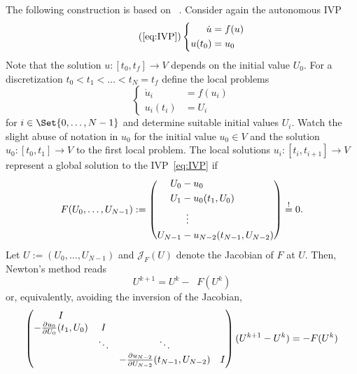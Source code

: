 The following construction is based on \citeauthor{Gander2007}~\cite{Gander2007}.
Consider again the autonomous \ac{IVP}
\begin{equation}
  \tag{\ref*{eq:IVP}}
  \left\{
  \begin{aligned}
    \dot u &= f(u) \\
    u(t_0) &= u_0
  \end{aligned}
  \right.
\end{equation}
Note that the solution $u : [t_0,t_f] \to V $ depends on the initial value $U_0$.
For a discretization $t_0 < t_1 < \ldots < t_N = t_f$
define the local problems
\begin{equation}
  \left\{
  \begin{aligned}
    \dot u_i &= f(u_i) \\
    u_i(t_i) &= U_i
  \end{aligned}
  \right.
\end{equation}
for $i \in \Set{0,\ldots,N-1}$
and determine suitable initial values $U_i$.
Watch the slight abuse of notation in $u_0$
for the initial value $u_0 \in V$
and the solution $u_0 : [t_0,t_1] \to V$ to the first local problem.
The local solutions $u_i : [t_i,t_{i+1}] \to V$ represent a global solution to the \ac{IVP}~\eqref{eq:IVP} if
\begin{equation}
  F(U_0, \ldots, U_{N-1}) :=
  \left(
  \begin{aligned}
    U_0 &- u_0 \\
    U_1 &- u_0(t_1, U_0) \\
    &\vdotswithin{-} \\
    U_{N-1} &- u_{N-2}(t_{N-1}, U_{N-2})
  \end{aligned}
  \right)
  \overset{!}{=} 0.
\end{equation}
Let $U := (U_0, \ldots, U_{N-1})$ and $\mathcal J_F(U)$ denote the Jacobian of $F$ at $U$.
Then, Newton's method reads
\begin{equation}
  U^{k+1} = U^k - \mathop{\mathcal J_F(U^k)^{-1}} F(U^k)
\end{equation}
or, equivalently, avoiding the inversion of the Jacobian,
\begin{equation}
  \begin{pmatrix}
    I \\
    -\pdiff{U_0}{u_0}(t_1, U_0) & I \\
    & \ddots & \ddots \\
    && -\pdiff{U_{N-2}}{u_{N-2}}(t_{N-1}, U_{N-2}) & I
  \end{pmatrix}
  (U^{k+1} - U^k) = -F(U^k)
\end{equation}
